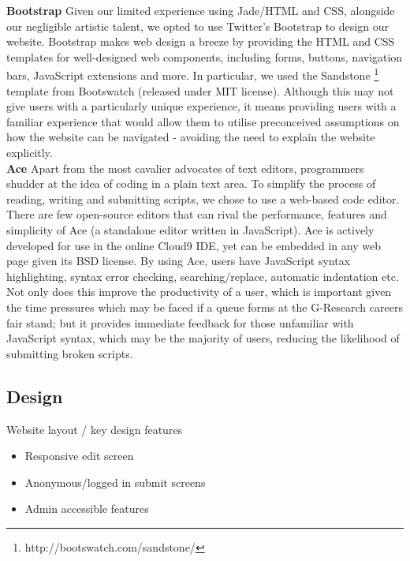 \noindent
{\bf Bootstrap}  \hspace*{2mm} 
Given our limited experience using Jade/HTML and CSS, alongside our negligible artistic talent, we opted to use Twitter's Bootstrap to design our website. Bootstrap makes web design a breeze by providing the HTML and CSS templates for well-designed web components, including forms, buttons, navigation bars, JavaScript extensions and more. In particular, we used the Sandstone \footnote{http://bootswatch.com/sandstone/} template from Bootswatch (released under MIT license). Although this may not give users with a particularly unique experience, it means providing users with a familiar experience that would allow them to utilise preconceived assumptions on how the website can be navigated - avoiding the need to explain the website explicitly.
\\

\noindent
{\bf Ace} \hspace*{2mm} 
Apart from the most cavalier advocates of text editors, programmers shudder at the idea of coding in a plain text area. To simplify the process of reading, writing and submitting scripts, we chose to use a web-based code editor. There are few open-source editors that can rival the performance, features and simplicity of Ace (a standalone editor written in JavaScript). Ace is actively developed for use in the online Cloud9 IDE, yet can be embedded in any web page given its BSD license. By using Ace, users have JavaScript syntax highlighting, syntax error checking, searching/replace, automatic indentation etc. Not only does this improve the productivity of a user, which is important given the time pressures which may be faced if a queue forms at the G-Research careers fair stand; but it provides immediate feedback for those unfamiliar with JavaScript syntax, which may be the majority of users, reducing the likelihood of submitting broken scripts.
\\

\subsection{Design}
Website layout / key design features 
\begin{itemize}
\item Responsive edit screen
\item Anonymous/logged in submit screens
\item Admin accessible features
\end{itemize}

